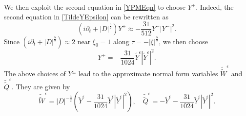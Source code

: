 \documentclass[12pt]{amsart}
\theoremstyle{remark}
\theoremstyle{definition}
\numberwithin{equation}{section}
\newcommand{\f}{\frac}
\begin{document}
We then exploit the second equation in \eqref{YPMEqn} to choose $Y^+$.
Indeed, the second equation in \eqref{TildeYEpsilon} can be rewritten as
\begin{equation*}
  (i\partial_t+|D|^\f52)Y^+ \approx  -\f{31}{512} Y^- |Y^-|^2.  
\end{equation*}
Since $(i\partial_t + |D|^{\f52}) \approx 2$ near $\xi_0 = 1$ along $\tau = - |\xi|^{\f52}$, we then choose
\begin{equation*}
    Y^+ = -\frac{31}{1024} \tilde{Y}^\epsilon |\tilde{Y}^\epsilon|^2.
\end{equation*}
The above choices of $Y^\pm$ lead to the approximate normal form variables $\tilde{\tilde{W}}^\epsilon$ and $\tilde{\tilde{Q}}^\epsilon$.
They are given by
\begin{equation} \label{DoubleTildeWQEpsilon}
 \tilde{\tilde{W}}^\epsilon = |D|^{-\f32}\left(\tilde{Y}^\epsilon -\frac{31}{1024} \tilde{Y}^\epsilon |\tilde{Y}^\epsilon|^2\right), \quad \tilde{\tilde{Q}}^\epsilon = -\tilde{Y}^\epsilon-\frac{31}{1024} \tilde{Y}^\epsilon |\tilde{Y}^\epsilon|^2.
\end{equation}
\end{document}
